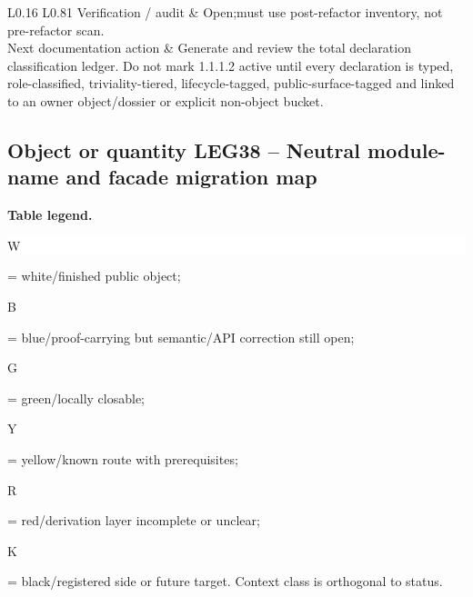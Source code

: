 \begin{longtable}{L{0.16\linewidth} L{0.81\linewidth}}
\hline\addlinespace[0.20em]
Verification /\allowbreak{} audit & Open;\newline must use post-refactor inventory, not pre-refactor scan.\\
\hline\addlinespace[0.20em]
Next documentation action & Generate and review the total declaration classification ledger. Do not mark 1.1.1.2 active until every declaration is typed, role-classified, triviality-tiered, lifecycle-tagged, public-surface-tagged and linked to an owner object/\allowbreak{}dossier or explicit non-object bucket.\\
\hline\addlinespace[0.20em]
\end{longtable}
\subsection*{Object or quantity LEG38 -- Neutral module-name and facade migration map}
\hypertarget{objproof:LEG38}{}
\par\smallskip\noindent\begin{minipage}{0.99\linewidth}\footnotesize\raggedright\textbf{Table legend.} \colorbox{white}{\strut W} = white/finished public object; \colorbox{cyan!20}{\strut B} = blue/proof-carrying but semantic/API correction still open; \colorbox{green!18}{\strut G} = green/locally closable; \colorbox{yellow!25}{\strut Y} = yellow/known route with prerequisites; \colorbox{red!20}{\strut R} = red/derivation layer incomplete or unclear; \colorbox{black!18}{\strut K} = black/registered side or future target. Context class is orthogonal to status.\end{minipage}\par\vspace{0.25em}
